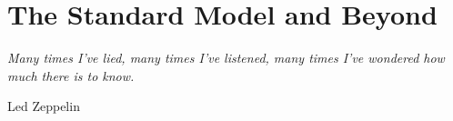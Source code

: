 \chapter{The Standard Model and Beyond}
\label{ch:theory} 
\epigraph{\emph{Many times I've lied, many times I've listened, many times I've wondered how much there is to know.}}{Led Zeppelin}

\newcommand{\SMparticles}{
\begin{wrapfigure}{R}{.5\textwidth}
\centering
\texttt{[image: Theory/SMv2]}
\caption{Elementary particles of the SM.
Fermions are separated into quarks (purple) and leptons (green) and arranged into columns according to generation. The fourth and fifth columns show the Gauge (red) and Higgs (yellow) bosons, respectively. Approximate values of the masses are given.}
\label{fig:SMparticles}
\end{wrapfigure}
}

\newcommand{\HiggsMexicanHat}{
\begin{figure}[!hbt]
\centering
\texttt{[image: Theory/HiggsMexicanHat]}
\caption{Visualisation of the "Mexican hat" Higgs potential in the complex imaginary plane. The movement from teh centre of the potential to the trough corresponds to the massive Higgs boson~\cite{Ellis:2012465}.}
\label{fig:HiggsMexicanHat}
\end{figure}
}

